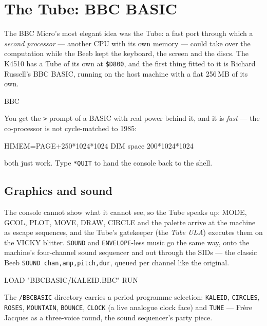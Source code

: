 \chapter{The Tube: BBC BASIC}\label{cha:tube}

The BBC Micro's most elegant idea was the Tube: a fast port through which a
\emph{second processor} --- another CPU with its own memory --- could take
over the computation while the Beeb kept the keyboard, the screen and the
discs. The K4510 has a Tube of its own at \texttt{\$D800}, and the first
thing fitted to it is Richard Russell's BBC BASIC, running on the host
machine with a flat 256\,MB of its own.

\begin{type}
BBC
\end{type}

You get the \verb|>| prompt of a BASIC with real power behind it, and it
is \emph{fast} --- the co-processor is not cycle-matched to 1985:

\begin{type}
HIMEM=PAGE+250*1024*1024
DIM space 200*1024*1024
\end{type}

both just work. Type \verb|*QUIT| to hand the console back to the shell.

\section{Graphics and sound}
The console cannot show what it cannot see, so the Tube speaks up: MODE,
GCOL, PLOT, MOVE, DRAW, CIRCLE and the palette arrive at the machine as
escape sequences, and the Tube's gatekeeper (the \emph{Tube ULA}) executes
them on the VICKY blitter. \verb|SOUND| and \verb|ENVELOPE|-less music go
the same way, onto the machine's four-channel sound sequencer and out
through the SIDs --- the classic Beeb \texttt{SOUND chan,amp,pitch,dur},
queued per channel like the original.

\begin{type}
LOAD "BBCBASIC/KALEID.BBC"
RUN
\end{type}


The \texttt{/BBCBASIC} directory carries a period programme selection:
\texttt{KALEID}, \texttt{CIRCLES}, \texttt{ROSES}, \texttt{MOUNTAIN},
\texttt{BOUNCE}, \texttt{CLOCK} (a live analogue clock face) and
\texttt{TUNE} --- Fr\`ere Jacques as a three-voice round, the sound
sequencer's party piece.

